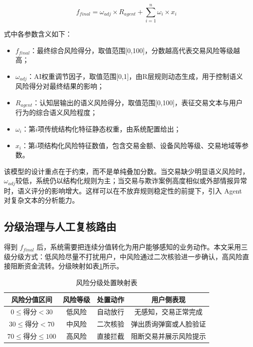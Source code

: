 \documentclass{xduugthesis}
\begin{document}
\begin{equation}
f_{final} = \omega_{adj} \times R_{agent} + \sum_{i=1}^{n} \omega_i \times x_i
\label{eq:final-score}
\end{equation}

式中各参数含义如下：

\begin{itemize}
    \item $f_{final}$：最终综合风险得分，取值范围[0,100]，分数越高代表交易风险等级越高；
    \item $\omega_{adj}$：AI权重调节因子，取值范围[0,1]，由R层规则动态生成，用于控制语义风险得分对最终结果的影响；
    \item $R_{agent}$：认知层输出的语义风险得分，取值范围[0,100]，表征交易文本与用户行为的综合语义风险程度；
    \item $\omega_i$：第$i$项传统结构化特征静态权重，由系统配置给出；
    \item $x_i$：第$i$项结构化风险特征数值，包含交易金额、设备风险等级、交易地域等参数。
\end{itemize}

该模型的设计重点在于约束，而不是单纯叠加分数。当交易缺少明显语义风险时，$\omega_{adj}$较低，系统仍以结构化规则为主；当交易与欺诈案例高度相似或外部情报异常时，语义评分的影响增大。这样可以在不放弃规则稳定性的前提下，引入 Agent 对复杂文本的分析能力。

\subsection{分级治理与人工复核路由}
得到 $f_{final}$ 后，系统需要把连续分值转化为用户能够感知的业务动作。本文采用三级分级方式：低风险尽量不打扰用户，中风险通过二次核验进一步确认，高风险直接阻断资金流转。分级映射如表\ref{tab:risk-grading}所示。

\begin{table}[H]
    \centering
    \caption{风险分级处置映射表}
    \label{tab:risk-grading}
    \begin{tabular}{|c|c|c|c|}
        \hline
        风险分值区间 & 风险等级 & 处置动作 & 用户侧表现 \\
        \hline
        $0 \le \text{得分} < 30$ & 低风险 & 自动放行 & 无感知，交易正常完成 \\
        \hline
        $30 \le \text{得分} < 70$ & 中风险 & 二次核验 & 弹出质询弹窗或人脸验证 \\
        \hline
        $70 \le \text{得分} \le 100$ & 高风险 & 直接拦截 & 阻断交易并展示风险提示 \\
        \hline
    \end{tabular}
\end{table}
\end{document}
